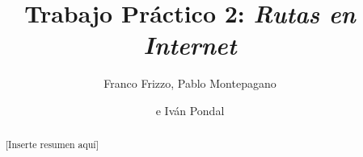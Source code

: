 \documentclass[%
    final,
    notitlepage,
    narroweqnarray,
    inline,
    twoside,
]{ieee}
\begin{document}
\title[Trabajo Práctico 2: Rutas en Internet]{%
       Trabajo Práctico 2: \emph{Rutas en Internet}}

\author[FRIZZO, MONTEPAGANO, PONDAL]{Franco Frizzo, Pablo Montepagano
\and{}e Iván Pondal}


\maketitle

\begin{abstract}
[Inserte resumen aquí]
\end{abstract}

\begin{keywords}
\end{keywords}







\end{document}
